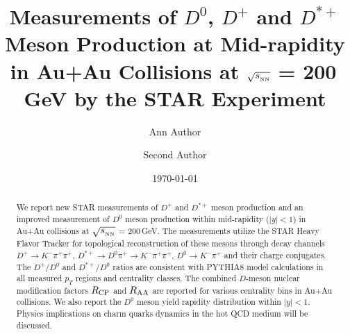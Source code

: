 \documentclass[%
 reprint,
 amsmath,amssymb,
 aps,
]{revtex4-1}
\begin{document}

\title{Measurements of $D^0$, $D^+$ and $D^{*+}$ Meson Production at Mid-rapidity in Au+Au Collisions at $\sqrt{s_{_{\rm NN}}}$ = 200\,GeV by the STAR Experiment}%

\author{Ann Author}
\author{Second Author}%
%


\date{\today}%

\begin{abstract}
We report new STAR measurements of $D^+$ and $D^{*+}$ meson production and an improved measurement of $D^{0}$ meson production within mid-rapidity ($|y|<1$) in Au+Au collisions at $\sqrt{s_{_{\rm NN}}}$ = 200\,GeV. The measurements utilize the STAR Heavy Flavor Tracker for topological reconstruction of these mesons through decay channels $D^+\rightarrow K^-\pi^+\pi^+$, $D^{*+}\rightarrow D^{0}\pi^+\rightarrow K^-\pi^+\pi^+$, $D^0\rightarrow K^-\pi^+$ and their charge conjugates. The $D^+/D^0$ and $D^{*+}/D^{0}$ ratios are consistent with PYTHIA8 model calculations in all measured $p_T$ regions and centrality classes. The combined $D$-meson nuclear modification factors $R_{\rm CP}$ and $R_{\rm AA}$ are reported for various centrality bins in Au+Au collisions. We also report the $D^0$ meson yield rapidity distribution within $|y|<1$. Physics implications on charm quarks dynamics in the hot QCD medium will be discussed.

\end{abstract}

\maketitle

\end{document}
